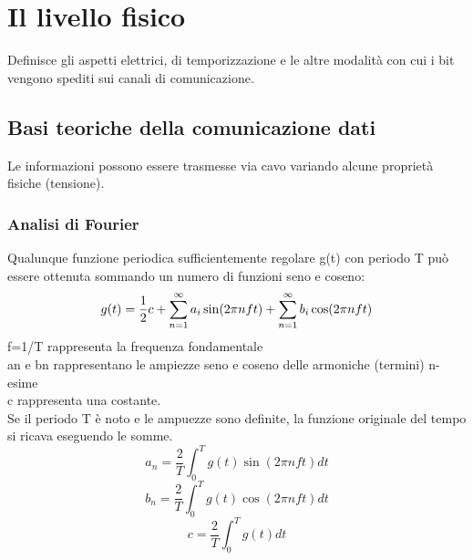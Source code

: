 \documentclass{article}
\begin{document}
		\section{Il livello fisico}
		Definisce gli aspetti elettrici, di temporizzazione e le altre modalità con cui i bit vengono spediti sui canali di comunicazione.\\
		\subsection{Basi teoriche della comunicazione dati}
		Le informazioni possono essere trasmesse via cavo variando alcune proprietà fisiche (tensione).
		\subsubsection{Analisi di Fourier}
		Qualunque funzione periodica sufficientemente regolare g(t) con periodo T può essere ottenuta sommando un numero di funzioni seno e coseno: \\
		\begin{equation}
			g(t) = \frac{1}{2}c+\sum_{n=1}^\infty a_i\sin (2\pi nft)+\sum_{n=1}^\infty b_i\cos (2\pi nft)\\
		\end{equation}
		f=1/T rappresenta la frequenza fondamentale \\ 
		a\ped n e b\ped n rappresentano le ampiezze seno e coseno delle armoniche (termini) n-esime\\
		c rappresenta una costante.\\
		Se il periodo T è noto e le ampuezze sono definite, la funzione originale del tempo si ricava eseguendo le somme.\\
				\begin{equation}
			a_n=\frac{2}{T} \int_{0}^{T}g(t)\sin (2\pi nft) dt			
		\end{equation}
		\begin{equation}
			b_n=\frac{2}{T} \int_{0}^{T}g(t)\cos(2\pi nft)dt
		\end{equation}
		\begin{equation}
			c=\frac{2}{T} \int_{0}^{T}g(t)dt
		\end{equation}
\end{document}
